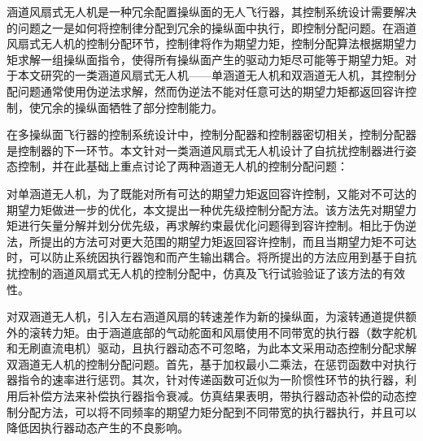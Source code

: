 \begin{abstractCN}
涵道风扇式无人机是一种冗余配置操纵面的无人飞行器，其控制系统设计需要解决的问题之一是如何将控制律分配到冗余的操纵面中执行，即控制分配问题。在涵道风扇式无人机的控制分配环节，控制律将作为期望力矩，控制分配算法根据期望力矩求解一组操纵面指令，使得所有操纵面产生的驱动力矩尽可能等于期望力矩。对于本文研究的一类涵道风扇式无人机——单涵道无人机和双涵道无人机，其控制分配问题通常使用伪逆法求解，然而伪逆法不能对任意可达的期望力矩都返回容许控制，使冗余的操纵面牺牲了部分控制能力。

在多操纵面飞行器的控制系统设计中，控制分配器和控制器密切相关，控制分配器是控制器的下一环节。本文针对一类涵道风扇式无人机设计了自抗扰控制器进行姿态控制，并在此基础上重点讨论了两种涵道无人机的控制分配问题：

对单涵道无人机，为了既能对所有可达的期望力矩返回容许控制，又能对不可达的期望力矩做进一步的优化，本文提出一种优先级控制分配方法。该方法先对期望力矩进行矢量分解并划分优先级，再求解约束最优化问题得到容许控制。相比于伪逆法，所提出的方法可对更大范围的期望力矩返回容许控制，而且当期望力矩不可达时，可以防止系统因执行器饱和而产生输出耦合。将所提出的方法应用到基于自抗扰控制的涵道风扇式无人机的控制分配中，仿真及飞行试验验证了该方法的有效性。	
	
对双涵道无人机，引入左右涵道风扇的转速差作为新的操纵面，为滚转通道提供额外的滚转力矩。由于涵道底部的气动舵面和风扇使用不同带宽的执行器（数字舵机和无刷直流电机）驱动，且执行器动态不可忽略，为此本文采用动态控制分配求解双涵道无人机的控制分配问题。首先，基于加权最小二乘法，在惩罚函数中对执行器指令的速率进行惩罚。其次，针对传递函数可近似为一阶惯性环节的执行器，利用后补偿方法来补偿执行器指令衰减。仿真结果表明，带执行器动态补偿的动态控制分配方法，可以将不同频率的期望力矩分配到不同带宽的执行器执行，并且可以降低因执行器动态产生的不良影响。	
\end{abstractCN}


